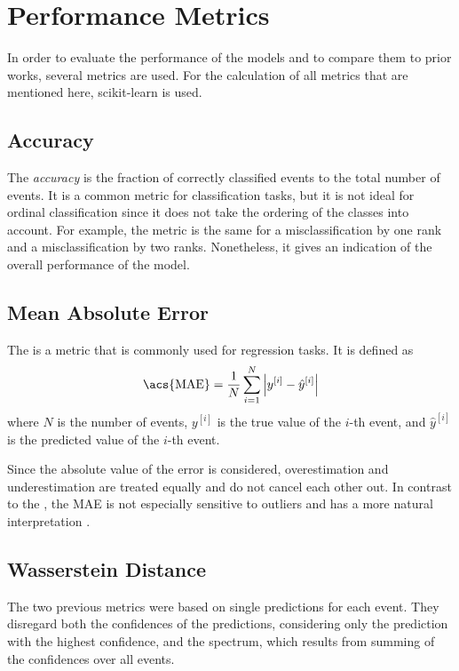 \section{Performance Metrics}
In order to evaluate the performance of the models
and to compare them to prior works,
several metrics are used.
%
For the calculation of all metrics that are mentioned here,
scikit-learn \cite{sklearn} is used.


\subsection{Accuracy} \label{sec:unfolding:metrics:accuracy}
The \emph{accuracy} \cite{accuracy} is the fraction of correctly classified events to the total number of events.
It is a common metric for classification tasks,
but it is not ideal for ordinal classification
  since it does not take the ordering of the classes into account.
For example,
the metric is the same for
a misclassification by one rank
and a misclassification by two ranks.
%
Nonetheless,
it gives an indication of the overall performance of the model.


\subsection{Mean Absolute Error} \label{sec:unfolding:metrics:mae}
The  \cite{mae} is a metric that is commonly used for regression tasks.
It is defined as
\begin{equation}
  \text{\acs{MAE}} = \frac{1}{N} \sum_{i=1}^N \left| y^{[i]} - \hat{y}^{[i]} \right|
\end{equation}
where $N$ is the number of events,
$y^{[i]}$ is the true value of the $i$-th event,
and $\hat{y}^{[i]}$ is the predicted value of the $i$-th event. %


Since the absolute value of the error is considered,
overestimation and underestimation are treated equally
and do not cancel each other out.
In contrast to the ,
the \ac{MAE} is not especially sensitive to outliers
and has a more natural interpretation \cite{mae}.


\subsection{Wasserstein Distance} \label{sec:unfolding:metrics:wd}
The two previous metrics were based on single predictions for each event.
They disregard both
  the confidences of the predictions,
    considering only the prediction with the highest confidence,
  and the spectrum,
    which results from summing of the confidences over all events.

